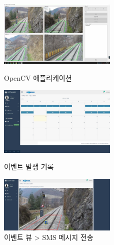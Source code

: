 \begin{itemize}[label=]
\begin{itemize}[label=]
	      \end{itemize}
	      \begin{figure}[!ht]
		      \begin{fullwidth}
			      \parbox{0.5\textwidth}{
				      \centering
				      \includegraphics[width=0.5\textwidth]{images/korail_aod_01.jpg}
				      \caption*{OpenCV 애플리케이션}
			      }\qquad
			      \parbox{0.5\textwidth}{
				      \centering
				      \includegraphics[width=0.5\textwidth]{images/korail_aod_02.jpg}
				      \caption*{이벤트 발생 기록}
			      }\qquad
			      \parbox{0.5\textwidth}{
				      \centering
				      \includegraphics[width=0.5\textwidth]{images/korail_aod_03_01.png}
				      \caption*{이벤트 뷰 > SMS 메시지 전송}
			      }
		      \end{fullwidth}
	      \end{figure}
\end{itemize}

\divider


\label{m2m}

